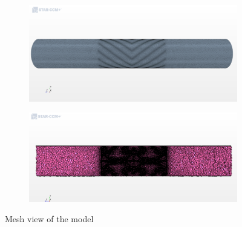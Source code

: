 \documentclass[journal,article,submit,moreauthors,pdftex]{Definitions/mdpi}
\begin{document}
\begin{figure}
\begin{center}
\centering
\begin{subfigure}{1.0\textwidth}
\includegraphics[width=\linewidth]{./docu_pictures/model1.png}
\end{subfigure}
\begin{subfigure}{1.0\textwidth}
\includegraphics[width=\linewidth]{./docu_pictures/model2.png}
\end{subfigure}
\end{center}
\caption{Mesh view of the model}
\label{mesh-pictures}
\end{figure}
\end{document}
